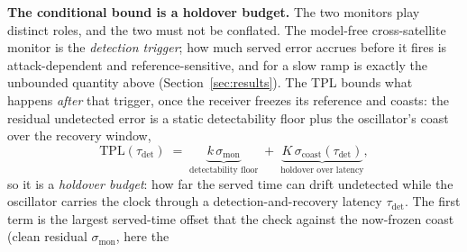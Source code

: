 \documentclass[conference]{IEEEtran}
\begin{document}
\textbf{The conditional bound is a holdover budget.} The two monitors play
distinct roles, and the two must not be conflated. The model-free cross-satellite
monitor is the \emph{detection trigger}; how much served error accrues before it
fires is attack-dependent and reference-sensitive, and for a slow ramp is exactly
the unbounded quantity above (Section~\ref{sec:results}). The TPL
bounds what happens \emph{after} that trigger, once the receiver freezes its
reference and coasts: the residual undetected error is a static detectability floor
plus the oscillator's coast over the recovery window,
\begin{equation}
\mathrm{TPL}(\tau_{\mathrm{det}}) \;=\; \underbrace{k\,\sigma_{\mathrm{mon}}}_{\text{detectability floor}}
\;+\;
\underbrace{K\,\sigma_{\mathrm{coast}}(\tau_{\mathrm{det}})}_{\text{holdover over latency}} ,
\label{eq:tpl}
\end{equation}
so it is a \emph{holdover budget}: how far the served time can drift undetected
while the oscillator carries the clock through a detection-and-recovery latency
$\tau_{\mathrm{det}}$. The first term is the largest served-time offset that the
check against the now-frozen coast (clean residual $\sigma_{\mathrm{mon}}$, here the
\end{document}
